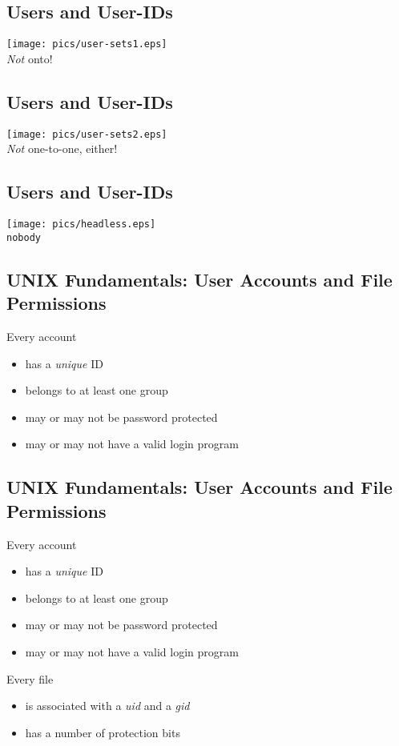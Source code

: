 \documentclass[xga]{xdvislides}
\begin{document}
\subsection{Users and User-IDs}
\begin{center}
	\texttt{[image: pics/user-sets1.eps]} \\
	{\em Not} onto!
\end{center}

\subsection{Users and User-IDs}
\begin{center}
	\texttt{[image: pics/user-sets2.eps]} \\
	{\em Not} one-to-one, either!
\end{center}

\subsection{Users and User-IDs}

\begin{center}
	\texttt{[image: pics/headless.eps]} \\
	{\tt nobody}
\end{center}

\subsection{UNIX Fundamentals: User Accounts and File Permissions}
Every account
\begin{itemize}
	\item has a {\em unique} ID
	\item belongs to at least one group
	\item may or may not be password protected
	\item may or may not have a valid login program
\end{itemize}

\subsection{UNIX Fundamentals: User Accounts and File Permissions}
Every account
\begin{itemize}
	\item has a {\em unique} ID
	\item belongs to at least one group
	\item may or may not be password protected
	\item may or may not have a valid login program
\end{itemize}
\addvspace{.5in}
Every file
\begin{itemize}
	\item is associated with a {\em uid} and a {\em gid}
	\item has a number of protection bits
\end{itemize}
\end{document}
